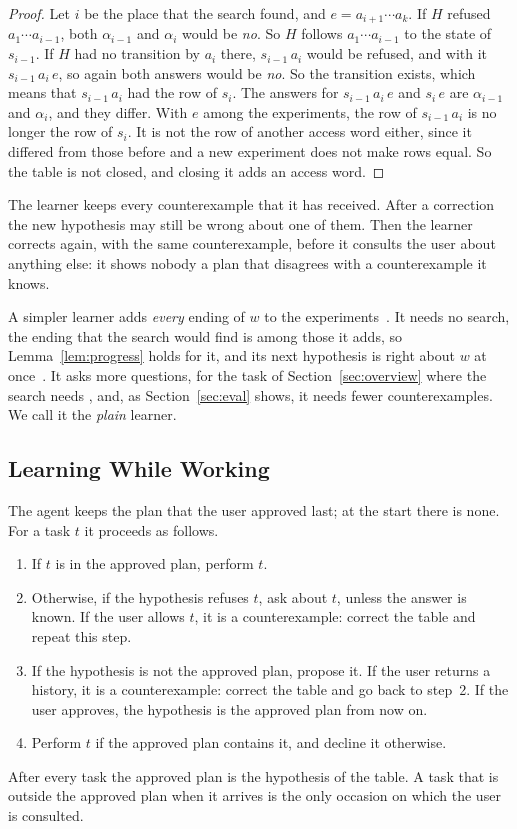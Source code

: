 \documentclass[acmsmall,nonacm,screen]{acmart}
\begin{document}
\begin{proof}
Let $i$ be the place that the search found, and $e = a_{i+1} \cdots a_k$. If $H$ refused
$a_1 \cdots a_{i-1}$, both $\alpha_{i-1}$ and $\alpha_i$ would be \emph{no}. So $H$ follows
$a_1 \cdots a_{i-1}$ to the state of $s_{i-1}$. If $H$ had no transition by $a_i$ there,
$s_{i-1}\,a_i$ would be refused, and with it $s_{i-1}\,a_i\,e$, so again both answers would
be \emph{no}. So the transition exists, which means that $s_{i-1}\,a_i$ had the row of
$s_i$. The answers for $s_{i-1}\,a_i\,e$ and $s_i\,e$ are $\alpha_{i-1}$ and $\alpha_i$, and
they differ. With $e$ among the experiments, the row of $s_{i-1}\,a_i$ is no longer the row
of $s_i$. It is not the row of another access word either, since it differed from those
before and a new experiment does not make rows equal. So the table is not closed, and
closing it adds an access word.
\end{proof}

The learner keeps every counterexample that it has received. After a correction the new
hypothesis may still be wrong about one of them. Then the learner corrects again, with the
same counterexample, before it consults the user about anything else: it shows nobody a plan
that disagrees with a counterexample it knows.

A simpler learner adds \emph{every} ending of $w$ to the experiments~\cite{maler1995}. It
needs no search, the ending that the search would find is among those it adds, so
Lemma~\ref{lem:progress} holds for it, and its next hypothesis is right about $w$ at
once~\cite{angluin1987}. It asks more questions, \exDialoguePlain{} for the task of
Section~\ref{sec:overview} where the search needs \exDialogueAsked{}, and, as
Section~\ref{sec:eval} shows, it needs fewer counterexamples. We call it the \emph{plain}
learner.

\subsection{Learning While Working}
\label{sec:working}

The agent keeps the plan that the user approved last; at the start there is none. For a task
$t$ it proceeds as follows.
\begin{enumerate}
\item If $t$ is in the approved plan, perform $t$.
\item Otherwise, if the hypothesis refuses $t$, ask about $t$, unless the answer is known. If
  the user allows $t$, it is a counterexample: correct the table and repeat this step.
\item If the hypothesis is not the approved plan, propose it. If the user returns a history,
  it is a counterexample: correct the table and go back to step~2. If the user approves, the
  hypothesis is the approved plan from now on.
\item Perform $t$ if the approved plan contains it, and decline it otherwise.
\end{enumerate}
After every task the approved plan is the hypothesis of the table. A task that is outside
the approved plan when it arrives is the only occasion on which the user is consulted.
\end{document}
